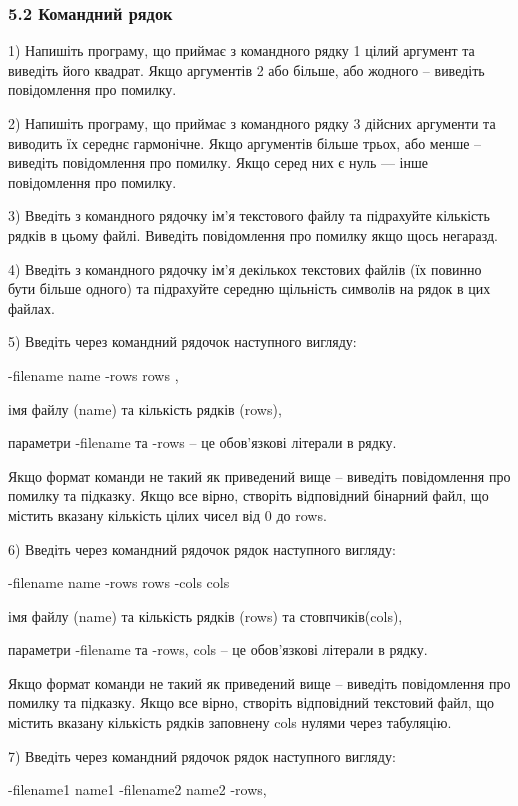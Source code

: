\documentclass[]{article}
\begin{document}
\subsubsection{5.2 Командний
рядок}\label{ux43aux43eux43cux430ux43dux434ux43dux438ux439-ux440ux44fux434ux43eux43a}

1) Напишіть програму, що приймає з командного рядку 1 цілий аргумент та
виведіть його квадрат. Якщо аргументів 2 або більше, або жодного --
виведіть повідомлення про помилку.

2) Напишіть програму, що приймає з командного рядку 3 дійсних аргументи
та виводить їх середнє гармонічне. Якщо аргументів більше трьох, або
менше -- виведіть повідомлення про помилку. Якщо серед них є нуль ---
інше повідомлення про помилку.

3) Введіть з командного рядочку ім'я текстового файлу та підрахуйте
кількість рядків в цьому файлі. Виведіть повідомлення про помилку якщо
щось негаразд.

4) Введіть з командного рядочку ім'я декількох текстових файлів (їх
повинно бути більше одного) та підрахуйте середню щільність символів на
рядок в цих файлах.

5) Введіть через командний рядочок наступного вигляду:

-filename name -rows rows ,

імя файлу (name) та кількість рядків (rows),

параметри -filename та -rows -- це обов'язкові літерали в рядку.

Якщо формат команди не такий як приведений вище -- виведіть повідомлення
про помилку та підказку. Якщо все вірно, створіть відповідний бінарний
файл, що містить вказану кількість цілих чисел від 0 до rows.

6) Введіть через командний рядочок рядок наступного вигляду:

-filename name -rows rows -cols cols

імя файлу (name) та кількість рядків (rows) та стовпчиків(cols),

параметри -filename та -rows, cols -- це обов'язкові літерали в рядку.

Якщо формат команди не такий як приведений вище -- виведіть повідомлення
про помилку та підказку. Якщо все вірно, створіть відповідний текстовий
файл, що містить вказану кількість рядків заповнену cols нулями через
табуляцію.

7) Введіть через командний рядочок рядок наступного вигляду:

-filename1 name1 -filename2 name2 -rows,
\end{document}

